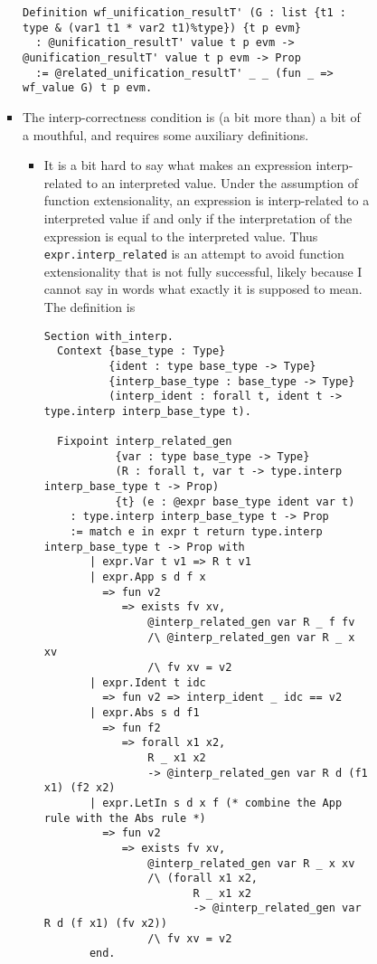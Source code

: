 \begin{itemize}
\begin{itemize}
\begin{itemize}
\begin{itemize}
\begin{itemize}
\begin{verbatim}
Definition wf_unification_resultT' (G : list {t1 : type & (var1 t1 * var2 t1)%type}) {t p evm}
  : @unification_resultT' value t p evm -> @unification_resultT' value t p evm -> Prop
  := @related_unification_resultT' _ _ (fun _ => wf_value G) t p evm.
\end{verbatim}
        \item
          The interp-correctness condition is (a bit more than) a bit of
          a mouthful, and requires some auxiliary definitions.

          \begin{itemize}
          \item
            It is a bit hard to say what makes an expression
            interp-related to an interpreted value. Under the assumption
            of function extensionality, an expression is interp-related
            to a interpreted value if and only if the interpretation of
            the expression is equal to the interpreted value. Thus
            \texttt{expr.interp\_related} is an attempt to avoid
            function extensionality that is not fully successful, likely
            because I cannot say in words what exactly it is supposed to
            mean. The definition is

\begin{verbatim}
Section with_interp.
  Context {base_type : Type}
          {ident : type base_type -> Type}
          {interp_base_type : base_type -> Type}
          (interp_ident : forall t, ident t -> type.interp interp_base_type t).

  Fixpoint interp_related_gen
           {var : type base_type -> Type}
           (R : forall t, var t -> type.interp interp_base_type t -> Prop)
           {t} (e : @expr base_type ident var t)
    : type.interp interp_base_type t -> Prop
    := match e in expr t return type.interp interp_base_type t -> Prop with
       | expr.Var t v1 => R t v1
       | expr.App s d f x
         => fun v2
            => exists fv xv,
                @interp_related_gen var R _ f fv
                /\ @interp_related_gen var R _ x xv
                /\ fv xv = v2
       | expr.Ident t idc
         => fun v2 => interp_ident _ idc == v2
       | expr.Abs s d f1
         => fun f2
            => forall x1 x2,
                R _ x1 x2
                -> @interp_related_gen var R d (f1 x1) (f2 x2)
       | expr.LetIn s d x f (* combine the App rule with the Abs rule *)
         => fun v2
            => exists fv xv,
                @interp_related_gen var R _ x xv
                /\ (forall x1 x2,
                       R _ x1 x2
                       -> @interp_related_gen var R d (f x1) (fv x2))
                /\ fv xv = v2
       end.


\end{verbatim}
\end{itemize}
\end{itemize}
\end{itemize}
\end{itemize}
\end{itemize}
\end{itemize}

